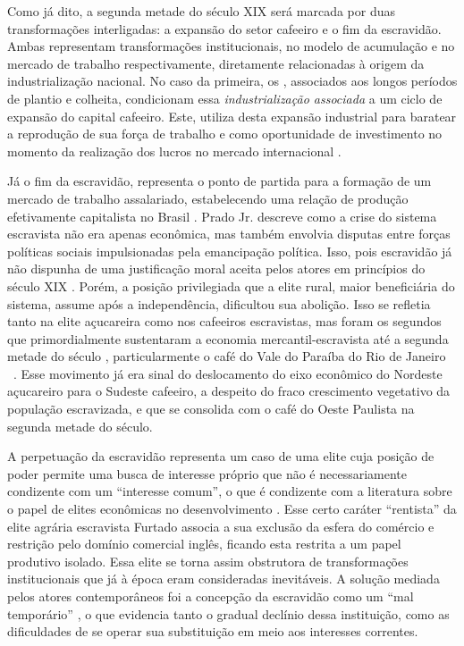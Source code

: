 Como já dito, a segunda metade do século XIX será marcada por duas
transformações interligadas: a expansão do setor cafeeiro e o fim da
escravidão. Ambas representam transformações institucionais, no modelo
de acumulação e no mercado de trabalho respectivamente, diretamente
relacionadas à origem da industrialização nacional. No caso da primeira,
os  , associados aos longos períodos
de plantio e colheita, condicionam essa \textit{industrialização associada} a um ciclo de
expansão do capital cafeeiro. Este, utiliza desta expansão industrial para baratear a 
reprodução de sua força de trabalho e como oportunidade de investimento no momento da
realização dos lucros no mercado internacional
\citep{mello1982}.

Já o fim da escravidão, representa o ponto de partida para a formação de
um mercado de trabalho assalariado, estabelecendo uma relação de
produção efetivamente capitalista no Brasil
\citep{mello1982}. Prado
Jr. \citeyearpar{pradojunior2012} descreve
como a crise do sistema escravista não era apenas econômica, mas também
envolvia disputas entre forças políticas sociais impulsionadas pela
emancipação política. Isso, pois escravidão já não dispunha de uma
justificação moral aceita pelos atores em princípios do século XIX
\citep{pradojunior2012}.
Porém, a posição privilegiada que a elite rural, maior beneficiária do
sistema, assume após a independência, dificultou sua abolição. Isso se
refletia tanto na elite açucareira como nos cafeeiros escravistas, mas
foram os segundos que primordialmente sustentaram a economia
mercantil-escravista até a segunda metade do século
\citep{mello1982},
particularmente o café do Vale do Paraíba do Rio de Janeiro
~. Esse
movimento já era sinal do deslocamento do eixo econômico do Nordeste
açucareiro para o Sudeste cafeeiro, a despeito do fraco crescimento
vegetativo da população escravizada, e que se consolida com o café do Oeste
Paulista na segunda metade do século.

A perpetuação da escravidão representa um caso de uma elite cuja posição de poder
permite uma busca de interesse próprio que não é necessariamente
condizente com um ``interesse comum'', o que é condizente com a literatura
sobre o papel de elites econômicas no desenvolvimento \citep[]{amsdenRoleElitesEconomic2012}.
Esse certo caráter ``rentista'' da elite agrária escravista Furtado
\citeyearpar{furtado2005} associa a sua
exclusão da esfera do comércio e restrição pelo domínio comercial
inglês, ficando esta restrita a um papel produtivo isolado. Essa elite
se torna assim obstrutora de transformações institucionais que já à
época eram consideradas inevitáveis. A solução mediada pelos atores
contemporâneos foi a concepção da escravidão como um ``mal temporário''
\citep{pradojunior2012},
o que evidencia tanto o gradual declínio dessa instituição, como as
dificuldades de se operar sua substituição em meio aos interesses
correntes.

